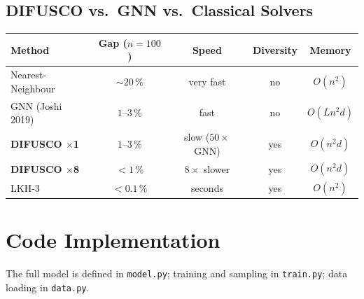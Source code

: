 \documentclass[12pt,a4paper]{article}
\begin{document}
\subsection*{DIFUSCO vs.\ GNN vs.\ Classical Solvers}

\begin{center}
\begin{tabularx}{\linewidth}{Xcccc}
\toprule
\textbf{Method} & \textbf{Gap ($n=100$)} & \textbf{Speed} &
  \textbf{Diversity} & \textbf{Memory} \\
\midrule
Nearest-Neighbour        & ${\sim}20\,\%$ & very fast & no  & $O(n^2)$ \\
GNN (Joshi 2019)         & $1$--$3\,\%$   & fast       & no  & $O(Ln^2d)$ \\
\textbf{DIFUSCO $\times$1} & $1$--$3\,\%$ & slow ($50\times$ GNN) & yes & $O(n^2d)$ \\
\textbf{DIFUSCO $\times$8} & $<1\,\%$     & $8\times$ slower & yes & $O(n^2d)$ \\
LKH-3                    & $<0.1\,\%$     & seconds    & yes & $O(n^2)$ \\
\bottomrule
\end{tabularx}
\end{center}

\section{Code Implementation}

The full model is defined in \texttt{model.py}; training and sampling in
\texttt{train.py}; data loading in \texttt{data.py}.
\end{document}
